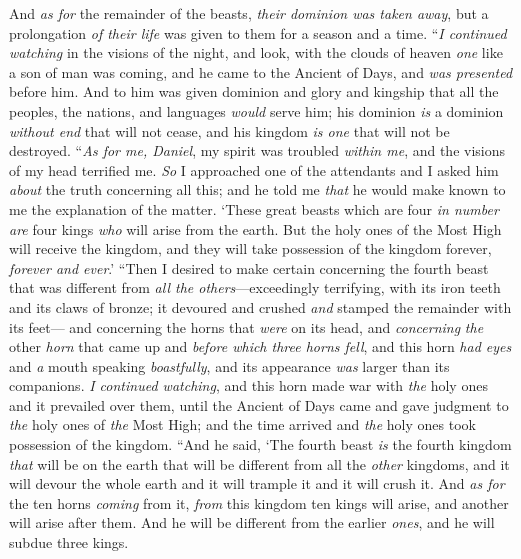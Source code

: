 \begin{biblechapter}
\verse And \textit{as for} the remainder of the beasts, \textit{their dominion was taken away}, but a prolongation \textit{of their life} was given to them for a season and a time.
\verse “\textit{I continued watching} in the visions of the night, and look, with the clouds of heaven \textit{one} like a son of man was coming, and he came to the Ancient of Days, and \textit{was presented} before him.
\verse And to him was given dominion and glory and kingship that all the peoples, the nations, and languages \textit{would} serve him; his dominion \textit{is} a dominion \textit{without end} that will not cease, and his kingdom \textit{is one} that will not be destroyed.
 “\textit{As for me, Daniel}, my spirit was troubled \textit{within me}, and the visions of my head terrified me.
\verse \textit{So} I approached one of the attendants and I asked him \textit{about} the truth concerning all this; and he told me \textit{that} he would make known to me the explanation of the matter.
\verse ‘These great beasts which are four \textit{in number} \textit{are} four kings \textit{who} will arise from the earth.
\verse But the holy ones of the Most High will receive the kingdom, and they will take possession of the kingdom forever, \textit{forever and ever}.’
\verse “Then I desired to make certain concerning the fourth beast that was different from \textit{all the others}—exceedingly terrifying, with its iron teeth and its claws of bronze; it devoured and crushed \textit{and} stamped the remainder with its feet—
\verse and concerning the horns that \textit{were} on its head, and \textit{concerning} \textit{the} other \textit{horn} that came up and \textit{before which three horns fell}, and this horn \textit{had eyes} and \textit{a} mouth speaking \textit{boastfully}, and its appearance \textit{was} larger than its companions.
\verse \textit{I continued watching}, and this horn made war with \textit{the} holy ones and it prevailed over them,
\verse until the Ancient of Days came and gave judgment to \textit{the} holy ones of \textit{the} Most High; and the time arrived and \textit{the} holy ones took possession of the kingdom.
\verse “And he said, ‘The fourth beast \textit{is} the fourth kingdom \textit{that} will be on the earth that will be different from all the \textit{other} kingdoms, and it will devour the whole earth and it will trample it and it will crush it.
\verse And \textit{as for} the ten horns \textit{coming} from it, \textit{from} this kingdom ten kings will arise, and another will arise after them. And he will be different from the earlier \textit{ones}, and he will subdue three kings.

\end{biblechapter}
